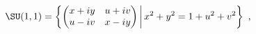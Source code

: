 \begin{equation*}
  \SU(1,1) = \left\{ 
    \begin{pmatrix}
      x + i y & u + i v\\ u - i v & x - i y
    \end{pmatrix}
    \biggl|\, x^2 + y^2 = 1 + u^2 + v^2 \right\}~,
\end{equation*}

